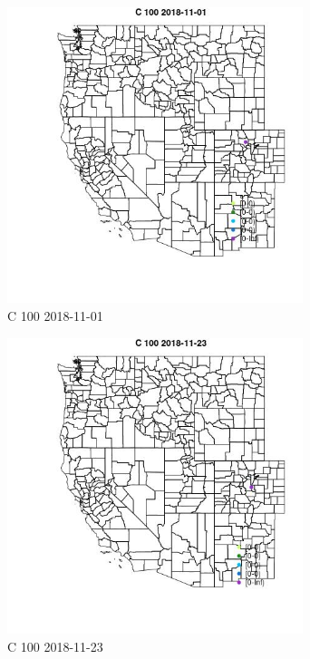 \begin{figure} 
\centering  
\includegraphics[width=0.77\textwidth]{Code_Outputs/Report_ML_input_PM25_Step4_part_e_de_duplicated_aves_MapObsC_1002018-11-01.jpg} 
\caption{\label{fig:Report_ML_input_PM25_Step4_part_e_de_duplicated_avesMapObsC_1002018-11-01}C 100 2018-11-01} 
\end{figure} 
 

\begin{figure} 
\centering  
\includegraphics[width=0.77\textwidth]{Code_Outputs/Report_ML_input_PM25_Step4_part_e_de_duplicated_aves_MapObsC_1002018-11-23.jpg} 
\caption{\label{fig:Report_ML_input_PM25_Step4_part_e_de_duplicated_avesMapObsC_1002018-11-23}C 100 2018-11-23} 
\end{figure} 
 

